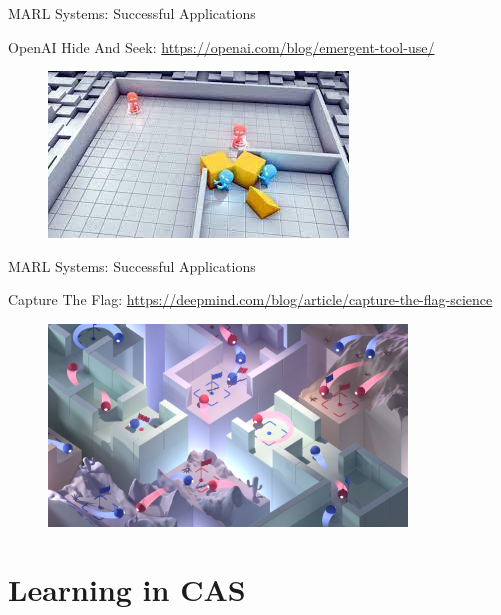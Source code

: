 \documentclass[presentation]{beamer}\mode<presentation>{\usetheme{AMSBolognaFC}}
\begin{document}
\begin{frame}{MARL Systems: Successful Applications}
	\centering
	\begin{exampleblock}{OpenAI Hide And Seek: \url{https://openai.com/blog/emergent-tool-use/}}
		\begin{figure}
			\href{https://www.youtube.com/watch?v=kopoLzvh5jY}{\includegraphics{img/hide-and-seek.jpeg}}
		\end{figure}
	\end{exampleblock}
\end{frame}

\begin{frame}{MARL Systems: Successful Applications}
	
	\begin{exampleblock}{Capture The Flag: \url{https://deepmind.com/blog/article/capture-the-flag-science}}
	\begin{figure}
		\centering
		\href{https://www.youtube.com/watch?v=dltN4MxV1RI}{\includegraphics[width=0.85\textwidth]{img/capture-the-flag.png}}
	\end{figure}	
	\end{exampleblock}
\end{frame}
\section{Learning in CAS}
\end{document}
